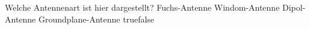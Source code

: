     {Welche Antennenart ist hier dargestellt?  }
    {Fuchs-Antenne}
    {Windom-Antenne}
    {Dipol-Antenne}
    {Groundplane-Antenne}
    {true}{false}